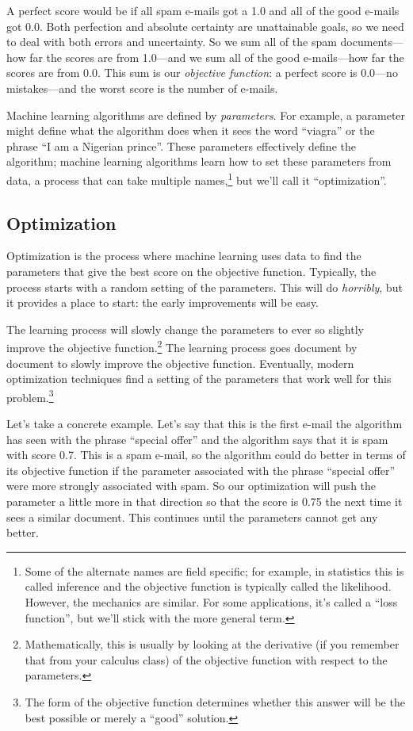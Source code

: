 A perfect score would be if all spam e-mails got a 1.0 and all of the
good e-mails got 0.0.  Both perfection and absolute certainty are
unattainable goals, so we need to deal with both errors and
uncertainty.  So we sum all of the spam documents---how far the scores
are from 1.0---and we sum all of the good e-mails---how far the scores
are from 0.0.  This sum is our \emph{objective function}: a perfect
score is 0.0---no mistakes---and the worst score is the number of
e-mails.

Machine learning algorithms are defined by \emph{parameters}.  For
example, a parameter might define what the algorithm does when it sees
the word ``viagra'' or the phrase ``I am a Nigerian prince''.  These
parameters effectively define the algorithm; machine learning
algorithms learn how to set these parameters from data, a process that
can take multiple names,\footnote{Some of the alternate names are
  field specific; for example, in statistics this is called inference
  and the objective function is typically called the likelihood.
  However, the mechanics are similar.  For some applications, it's
  called a ``loss function'', but we'll stick with the more general
  term.} but we'll call it ``optimization''.

\subsection{Optimization}

Optimization is the process where machine learning uses data to find
the parameters that give the best score on the objective function.
Typically, the process starts with a random setting of the parameters.
This will do \emph{horribly}, but it provides a place to start: the
early improvements will be easy.

The learning process will slowly change the parameters to ever so
slightly improve the objective function.\footnote{Mathematically, this
  is usually by looking at the derivative (if you remember that from your calculus class) of the objective function with
  respect to the parameters.}  The learning process goes document by
document to slowly improve the objective function.  Eventually, modern
optimization techniques find a setting of the parameters that work
well for this problem.\footnote{The form of the objective function
  determines whether this answer will be the best possible or merely a
  ``good'' solution.}

Let's take a concrete example.  Let's say that this is the first
e-mail the algorithm has seen with the phrase ``special offer'' and the algorithm says that it
is spam with score 0.7.  This is a spam e-mail, so the algorithm could
do better in terms of its objective function if the parameter
associated with the phrase ``special offer'' were more strongly
associated with spam.  So our optimization will push the parameter a
little more in that direction so that the score is 0.75 the next time
it sees a similar document.  This continues until the parameters
cannot get any better.

